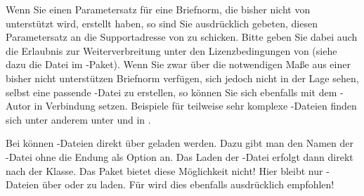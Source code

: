 Wenn Sie einen Parametersatz für eine Briefnorm, die bisher nicht von
\KOMAScript{} unterstützt wird, erstellt haben, so sind Sie ausdrücklich
gebeten, diesen Parametersatz an die Supportadresse von \KOMAScript{} zu
schicken. Bitte geben Sie dabei auch die Erlaubnis zur Weiterverbreitung unter
den Lizenzbedingungen von \KOMAScript{} (siehe dazu die Datei
\href{http://mirrors.ctan.org/macros/latex/contrib/koma-script/doc/lppl-de.txt}%
{} im \KOMAScript-Paket). Wenn Sie zwar über die notwendigen
Maße aus einer bisher nicht unterstützen Briefnorm verfügen, sich jedoch nicht
in der Lage sehen, selbst eine passende -Datei zu erstellen, so
können Sie sich ebenfalls mit dem \KOMAScript-Autor in Verbindung
setzen. Beispiele für teilweise sehr komplexe -Dateien finden sich
unter anderem unter \cite{homepage} und in \cite{DANTE:TK0203:MJK}.


\begin{Declaration}
\end{Declaration}
Bei  können -Dateien direkt
über  geladen werden. Dazu gibt man den
Namen der -Datei ohne die Endung als Option an. Das
Laden der -Datei erfolgt dann direkt nach der Klasse. Das Paket
 bietet diese Möglichkeit nicht! Hier
bleibt nur -Dateien über 
oder  zu
laden. Für  wird dies ebenfalls
ausdrücklich empfohlen!

